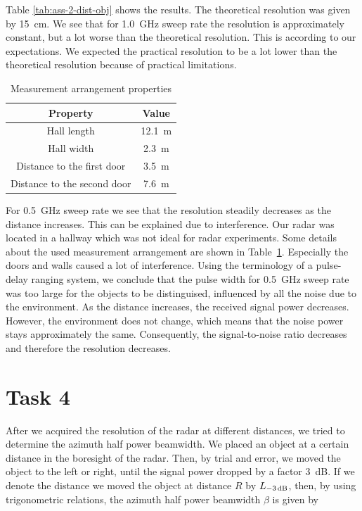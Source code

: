 \documentclass[11pt,titlepage]{report}
\begin{document}
Table \ref{tab:ass-2-dist-obj} shows the results. The theoretical resolution was given by \SI{15}{cm}. We see that for \SI{1.0}{GHz} sweep rate the resolution is approximately constant, but a lot worse than the theoretical resolution. This is according to our expectations. We expected the practical resolution to be a lot lower than the theoretical resolution because of practical limitations.

\begin{table}[H]
	\centering
	\caption{Measurement arrangement properties}
	\label{tab:ass-2-arr}
	\begin{tabular}{c c}
		\hline\hline
		Property & Value \\
		\hline
		Hall length & \SI{12.1}{m} \\
		Hall width & \SI{2.3}{m} \\
		Distance to the first door & \SI{3.5}{m} \\
		Distance to the second door & \SI{7.6}{m} \\
		\hline
	\end{tabular}
\end{table}

For \SI{0.5}{GHz} sweep rate we see that the resolution steadily decreases as the distance increases. This can be explained due to interference. Our radar was located in a hallway which was not ideal for radar experiments. Some details about the used measurement arrangement are shown in Table~\ref{tab:ass-2-arr}. Especially the doors and walls caused a lot of interference. Using the terminology of a pulse-delay ranging system, we conclude that the pulse width for \SI{0.5}{GHz} sweep rate was too large for the objects to be distinguised, influenced by all the noise due to the environment. As the distance increases, the received signal power decreases. However, the environment does not change, which means that the noise power stays approximately the same. Consequently, the signal-to-noise ratio decreases and therefore the resolution decreases.

\section{Task 4}
After we acquired the resolution of the radar at different distances, we tried to determine the azimuth half power beamwidth. We placed an object at a certain distance in the boresight of the radar. Then, by trial and error, we moved the object to the left or right, until the signal power dropped by a factor \SI{3}{dB}. If we denote the distance we moved the object at distance $R$ by $L_{\text{\SI{-3}{dB}}}$, then, by using trigonometric relations, the azimuth half power beamwidth $\beta$ is given by
\end{document}
